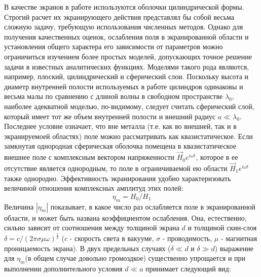 \documentclass[a4paper,12pt]{article}
\begin{document}
В качестве экранов в работе используются оболочки цилиндрической формы. Строгий расчет их экранирующего действия представлял бы собой весьма сложную задачу, требующую использования численных методов. Однако для получения качественных оценок, ослабления поля в экранированной области и установления общего характера его зависимости от параметров можно ограничиться изучением более простых моделей, допускающих точное решение задачи в известных аналитических функциях. Моделями такого рода являются, например, плоский, цилиндрический и сферический слои. Поскольку высота и диаметр внутренней полости используемых в работе цилиндров одинаковы и весьма малы по сравнению с длиной волны в свободном пространстве $\lambda_0$, наиболее адекватной моделью, по-видимому, следует считать сферический слой, который имеет тот же объем внутренней полости и внешний радиус $a \ll \lambda_0$. Последнее условие означает, что вне металла (т.е. как во внешней, так и в экранируемоей областях) поле можно рассматривать как квазистатическое.
Если замкнутая однородная сферическая оболочка помещена в квазистатическое внешнее поле с комплексным вектором напряженности $\vec{H}_{0} e^{i \omega t}$, которое в ее отсутствие является однородным, то поле в ограничиваемой ею области $\vec{H}_{1} e^{i \omega t}$ также однородно. Эффективность экранирования удобно характеризовать величиной отношения комплексных амплитуд этих полей:
\begin{equation} 
\eta_{m}=H_{0} / H_{1}
\label{eq:1}
\end{equation}
Величина $|\eta_{m}|$ показывает, в какое число раз ослабляется поле в экранированной области, и может быть названа коэффициентом ослабления. Она, естественно, сильно зависит от соотношения между толщиной экрана $d$ и толщиной скин-слоя $\delta=c/(2\pi\sigma\mu\omega)^{\frac{1}{2}}$ ($c$ - скорость света в вакууме, $\sigma$ - проводимость, $\mu$ - магнитная проницаемость экрана). В двух предельных случаях ($\delta \ll d$  и $\delta \gg d$) выражение для $\eta_{m}$(в общем случае довольно громоздкое) существенно упрощается и при выполнении дополнительного условия $d \ll a$ принимает следующий вид:
\end{document}
